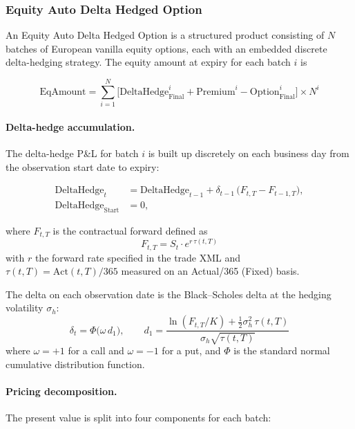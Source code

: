 \subsubsection{Equity Auto Delta Hedged Option}
\label{pricing:eq_autodeltahedgedoption}

An Equity Auto Delta Hedged Option is a structured product consisting of $N$
batches of European vanilla equity options, each with an embedded discrete
delta-hedging strategy.  The equity amount at expiry for each batch $i$ is

$$
\text{EqAmount} = \sum_{i=1}^{N}
  \bigl[\text{DeltaHedge}_{\text{Final}}^{i}
       + \text{Premium}^{i}
       - \text{Option}_{\text{Final}}^{i}\bigr]
  \times N^{i}
$$

\paragraph{Delta-hedge accumulation.}
The delta-hedge P\&L for batch $i$ is built up discretely on each business day
from the observation start date to expiry:

\begin{align*}
\text{DeltaHedge}_{t} &= \text{DeltaHedge}_{t-1}
  + \delta_{t-1}\,\bigl(F_{t,T} - F_{t-1,T}\bigr), \\
\text{DeltaHedge}_{\text{Start}} &= 0,
\end{align*}

where $F_{t,T}$ is the contractual forward defined as
$$
F_{t,T} = S_t \cdot e^{r\,\tau(t,T)}
$$
with $r$ the forward rate specified in the trade XML and
$\tau(t,T) = \text{Act}(t,T)/365$ measured on an Actual/365 (Fixed) basis.

The delta on each observation date is the Black--Scholes delta at the
hedging volatility $\sigma_h$:
$$
\delta_t = \Phi\!\bigl(\omega\, d_1\bigr),
\qquad
d_1 = \frac{\ln(F_{t,T}/K) + \tfrac{1}{2}\sigma_h^2\,\tau(t,T)}
           {\sigma_h\sqrt{\tau(t,T)}}
$$
where $\omega = +1$ for a call and $\omega = -1$ for a put, and $\Phi$ is
the standard normal cumulative distribution function.

\paragraph{Pricing decomposition.}
The present value is split into four components for each batch:

